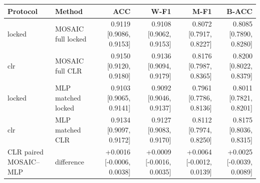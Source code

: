 \begin{tabular}{llrrrr}
\toprule
Protocol & Method & ACC & W-F1 & M-F1 & B-ACC \\
\midrule
locked & MOSAIC full locked & 0.9119 [0.9086, 0.9153] & 0.9108 [0.9062, 0.9153] & 0.8072 [0.7917, 0.8227] & 0.8085 [0.7890, 0.8280] \\
clr & MOSAIC full CLR & 0.9150 [0.9120, 0.9180] & 0.9136 [0.9094, 0.9179] & 0.8176 [0.7987, 0.8365] & 0.8200 [0.8022, 0.8379] \\
locked & MLP matched locked & 0.9103 [0.9065, 0.9141] & 0.9092 [0.9046, 0.9137] & 0.7961 [0.7786, 0.8136] & 0.8011 [0.7821, 0.8201] \\
clr & MLP matched CLR & 0.9134 [0.9097, 0.9172] & 0.9127 [0.9083, 0.9170] & 0.8112 [0.7974, 0.8250] & 0.8175 [0.8036, 0.8315] \\
\midrule
CLR paired MOSAIC--MLP & difference & +0.0016 [-0.0006, 0.0038] & +0.0009 [-0.0016, 0.0035] & +0.0064 [-0.0012, 0.0139] & +0.0025 [-0.0039, 0.0089] \\
\bottomrule
\end{tabular}
